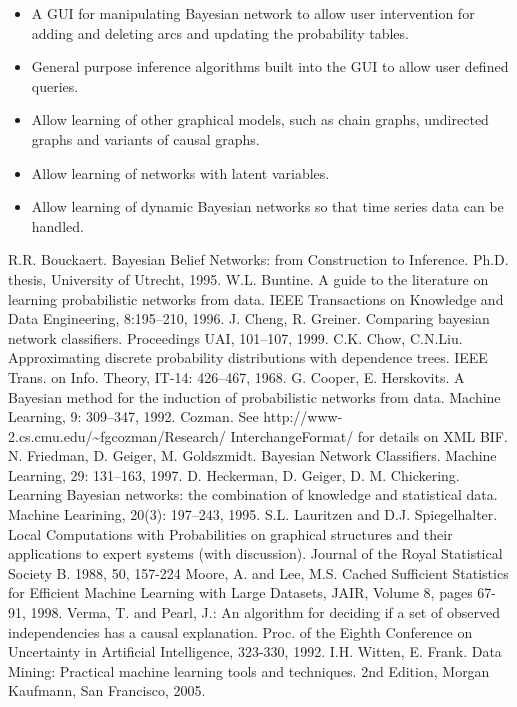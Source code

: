 \documentclass[a4paper]{article}
\begin{document}
\begin{itemize}
\item A GUI for manipulating Bayesian network to allow user intervention for
adding and deleting arcs and updating the probability tables.

\item General purpose inference algorithms built into the GUI to allow user
defined queries.

\item Allow learning of other graphical models, such as chain graphs,
undirected graphs and variants of causal graphs.

\item Allow learning of networks with latent variables.

\item Allow learning of dynamic Bayesian networks so that time series data
can be handled.
\end{itemize}



\begin{thebibliography}{1}
	R.R. Bouckaert. Bayesian Belief Networks: from Construction to Inference. 
	Ph.D. thesis, 
	University of Utrecht, 
	1995.
        W.L. Buntine. A guide to the literature on learning probabilistic networks from data. 
	IEEE Transactions on Knowledge and Data Engineering, 8:195--210, 
	1996. 
	J. Cheng, R. Greiner. 
	Comparing bayesian network classifiers. 
	Proceedings UAI,
	101--107,
	1999.
	C.K. Chow, C.N.Liu.
	Approximating discrete probability distributions with dependence trees.
	IEEE Trans. on Info. Theory, IT-14: 426--467, 1968.
	G. Cooper, E. Herskovits. 
	A Bayesian method for the induction of probabilistic networks from data. 
	Machine Learning, 9: 309--347, 1992.
	Cozman.
	See {\sf http://www-2.cs.cmu.edu/\~{}fgcozman/Research/	InterchangeFormat/}
for details on XML BIF.
	N. Friedman, D. Geiger, M. Goldszmidt. 
	Bayesian Network Classifiers. 
	Machine Learning, 29: 131--163, 1997.
	D. Heckerman, D. Geiger, D. M. Chickering. 
	Learning Bayesian networks: the combination of knowledge and statistical data. 
	Machine Learining, 20(3): 197--243, 1995.
    S.L. Lauritzen and D.J. Spiegelhalter.
    Local Computations with Probabilities on graphical structures and their applications to expert systems (with discussion).
    Journal of the Royal Statistical Society B.
    1988,
    50,
    157-224
  Moore, A. and Lee, M.S. Cached Sufficient Statistics for Efficient Machine Learning with Large Datasets,
  JAIR, 
  Volume 8, pages 67-91, 1998. 
  Verma, T. and Pearl, J.: 
  An algorithm for deciding if a set of observed independencies has a causal explanation. 
  Proc. of the Eighth Conference on Uncertainty in Artificial Intelligence, 
  323-330, 
1992.
  I.H. Witten, E. Frank.
  Data Mining: Practical machine learning tools and techniques.
  2nd Edition, Morgan Kaufmann, San Francisco, 2005.
\end{thebibliography}
\end{document}
